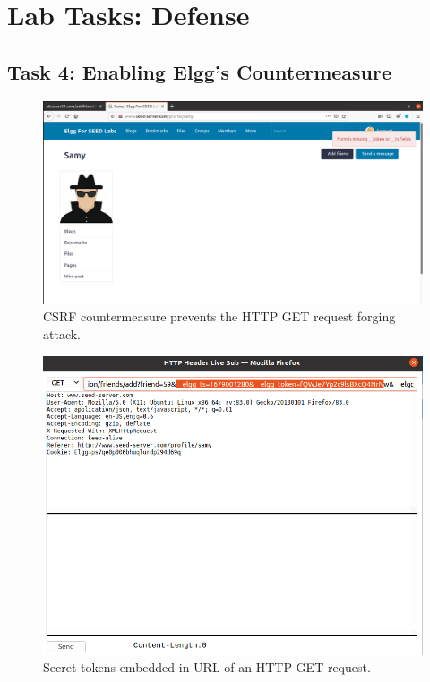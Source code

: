 \section{Lab Tasks: Defense}
%
\subsection{Task 4: Enabling Elgg's Countermeasure}
%
\begin{figure}
    \centering
    \includegraphics[height=\textheight,width=\textwidth,keepaspectratio]
    {figures/add_friend_countermeasure.png}
    \caption{CSRF countermeasure prevents the HTTP GET request forging attack.}
    \label{fig:counter_add_friend}
\end{figure}

\begin{figure}
    \centering
    \includegraphics[height=\textheight,width=\textwidth,keepaspectratio]
    {figures/token_http_get.png}
    \caption{Secret tokens embedded in URL of an HTTP GET request.}
    \label{fig:secret_token}
\end{figure}

